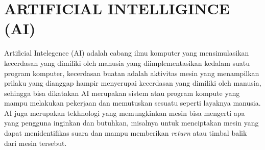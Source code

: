 \chapter{ARTIFICIAL INTELLIGINCE (AI)}

Artificial Intelegence (AI) adalah cabang ilmu komputer yang mensimulasikan kecerdasan yang dimiliki oleh manusia yang diimplementasikan kedalam suatu program komputer, kecerdasan buatan adalah aktivitas mesin yang menampilkan prilaku yang dianggap hampir menyerupai kecerdasan yang dimiliki oleh manusia, sehingga bisa dikatakan AI merupakan sistem atau program kompute yang mampu melakukan pekerjaan dan memutuskan sesuatu seperti layaknya manusia.
AI juga merupakan tekhnologi yang memungkinkan mesin bisa mengerti apa yang pengguna inginkan dan butuhkan, misalnya untuk menciptakan mesin yang dapat menidentifikas suara dan mampu memberikan \textit{return} atau timbal balik dari mesin tersebut.


